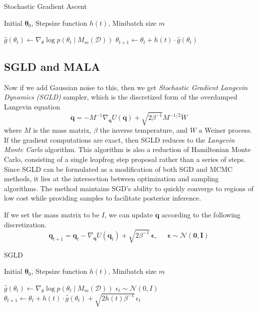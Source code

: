 \documentclass{article}
\theoremstyle{remark}
\theoremstyle{definition}
\begin{document}
\begin{algorithm}
\caption{Stochastic Gradient Ascent}\label{alg:cap}
\begin{algorithmic}

\Require Initial $\boldsymbol{\theta}_0$, Stepsize function $h(t)$, Minibatch size $m$

    \State $\hat{g}(\theta_t) \gets \nabla_\theta \log{p(\theta_t \mid M_m(\mathcal{D}))}$
    \State $\theta_{t+1} \gets \theta_t + h(t) \cdot \hat{g}(\theta_t)$
\EndFor

\end{algorithmic}
\end{algorithm}

\subsection{SGLD and MALA}

Now if we add Gaussian noise to this, then we get \textit{Stochastic Gradient Langevin Dynamics (SGLD)} sampler, which is the discretized form of the overdamped Langevin equation 
\[\mathbf{\dot{q}} = - M^{-1} \nabla_\mathbf{q} U(\mathbf{q}) + \sqrt{2 \beta^{-1}} M^{-1/2} \dot{W}\]
where $M$ is the mass matrix, $\beta$ the inverse temperature, and $\dot{W}$ a Weiner process. If the gradient computations are exact, then SGLD reduces to the \textit{Langevin Monte Carlo} algorithm. This algorithm is also a reduction of Hamiltonian Monte Carlo, consisting of a single leapfrog step proposal rather than a series of steps. Since SGLD can be formulated as a modification of both SGD and MCMC methods, it lies at the intersection between optimization and sampling algorithms. The method maintains SGD's ability to quickly converge to regions of low cost while providing samples to facilitate posterior inference. 

If we set the mass matrix to be $I$, we can update $\mathbf{q}$ according to the following discretization. 
\[\mathbf{q}_{t+1} = \mathbf{q}_t - \nabla_{\mathbf{q}} U(\mathbf{q}_t) + \sqrt{2 \beta^{-1}} \, \boldsymbol{\epsilon}, \;\;\;\;\; \boldsymbol{\epsilon} \sim \mathcal{N}(\mathbf{0}, \mathbf{I})\]

\begin{algorithm}
\caption{SGLD}\label{alg:cap}
\begin{algorithmic}

\Require Initial $\boldsymbol{\theta}_0$, Stepsize function $h(t)$, Minibatch size $m$

    \State $\hat{g}(\theta_t) \gets \nabla_\theta \log{p(\theta_t \mid M_m(\mathcal{D}))}$
    \State $\epsilon_t \sim \mathcal{N}(0, I)$
    \State $\theta_{t+1} \gets \theta_t + h(t) \cdot \hat{g}(\theta_t) + \sqrt{2 h(t) \beta^{-1}} \, \epsilon_t$
\EndFor

\end{algorithmic}
\end{algorithm}
\end{document}
